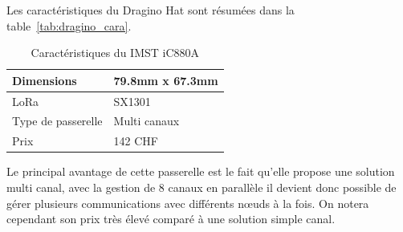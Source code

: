 Les caractéristiques du Dragino Hat sont résumées dans la table~\ref{tab:dragino_cara}.

\begin{table}[htb]
\caption[Caractéristiques du IMST iC880A]{Caractéristiques du IMST iC880A}
\label{tab:imst_cara}
\centering
\begin{tabular}{ l | l }
\toprule
Dimensions & 79.8mm x 67.3mm \\
\midrule
LoRa & SX1301 \\
\midrule
Type de passerelle & Multi canaux \\
\midrule
Prix & 142 CHF \\
\bottomrule
\end{tabular}
\end{table}

Le principal avantage de cette passerelle est le fait qu’elle propose une solution multi canal, avec la gestion de 8 canaux en parallèle il devient donc possible de gérer plusieurs communications avec différents nœuds à la fois. On notera cependant son prix très élevé comparé à une solution simple canal.
